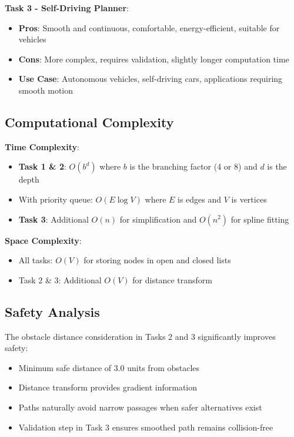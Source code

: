\documentclass[aps,letterpaper,10pt]{revtex4}
\begin{document}
\textbf{Task 3 - Self-Driving Planner}:
\begin{itemize}
    \item \textbf{Pros}: Smooth and continuous, comfortable, energy-efficient, suitable for vehicles
    \item \textbf{Cons}: More complex, requires validation, slightly longer computation time
    \item \textbf{Use Case}: Autonomous vehicles, self-driving cars, applications requiring smooth motion
\end{itemize}

\subsection{Computational Complexity}

\textbf{Time Complexity}:
\begin{itemize}
    \item \textbf{Task 1 \& 2}: $O(b^d)$ where $b$ is the branching factor (4 or 8) and $d$ is the depth
    \item With priority queue: $O(E \log V)$ where $E$ is edges and $V$ is vertices
    \item \textbf{Task 3}: Additional $O(n)$ for simplification and $O(n^2)$ for spline fitting
\end{itemize}

\textbf{Space Complexity}:
\begin{itemize}
    \item All tasks: $O(V)$ for storing nodes in open and closed lists
    \item Task 2 \& 3: Additional $O(V)$ for distance transform
\end{itemize}

\subsection{Safety Analysis}

The obstacle distance consideration in Tasks 2 and 3 significantly improves safety:

\begin{itemize}
    \item Minimum safe distance of 3.0 units from obstacles
    \item Distance transform provides gradient information
    \item Paths naturally avoid narrow passages when safer alternatives exist
    \item Validation step in Task 3 ensures smoothed path remains collision-free
\end{itemize}
\end{document}
